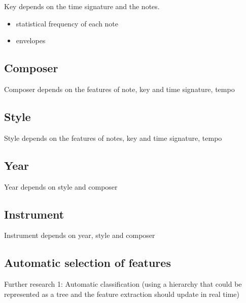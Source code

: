 \documentclass[a4paper,12pt]{article}
\begin{document}
Key depends on the time signature and the notes. 

\begin{itemize}
    \item statistical frequency of each note 
    \item envelopes
\end{itemize}

\subsection{Composer}

Composer depends on the features of note, key and time signature, tempo

\subsection{Style}

Style depends on the features of notes, key and time signature, tempo

\subsection{Year}

Year depends on style and composer

\subsection{Instrument}

Instrument depends on year, style and composer

\subsection{Automatic selection of features}    

Further research 1: Automatic classification (using a hierarchy that could be represented as a tree and the feature extraction should update in real time)


\end{document}
